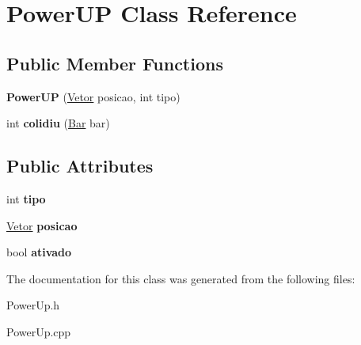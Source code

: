 \hypertarget{classPowerUP}{\section{\-Power\-U\-P \-Class \-Reference}
\label{classPowerUP}
}
\subsection*{\-Public \-Member \-Functions}
\begin{DoxyCompactItemize}
\item 
\hypertarget{classPowerUP_a5636298a65a37c1c8138d96e1b61684a}{{\bfseries \-Power\-U\-P} (\hyperlink{classVetor}{\-Vetor} posicao, int tipo)}\label{classPowerUP_a5636298a65a37c1c8138d96e1b61684a}

\item 
\hypertarget{classPowerUP_a06703041b5977e8cea4362ff6b9d4e90}{int {\bfseries colidiu} (\hyperlink{classBar}{\-Bar} bar)}\label{classPowerUP_a06703041b5977e8cea4362ff6b9d4e90}

\end{DoxyCompactItemize}
\subsection*{\-Public \-Attributes}
\begin{DoxyCompactItemize}
\item 
\hypertarget{classPowerUP_a83a746438f21b75738556af92e69d7c4}{int {\bfseries tipo}}\label{classPowerUP_a83a746438f21b75738556af92e69d7c4}

\item 
\hypertarget{classPowerUP_a23eeb213d8f01d976dce2da04ed1cd7b}{\hyperlink{classVetor}{\-Vetor} {\bfseries posicao}}\label{classPowerUP_a23eeb213d8f01d976dce2da04ed1cd7b}

\item 
\hypertarget{classPowerUP_aca4e403b0d439f34606c611c5e7269e5}{bool {\bfseries ativado}}\label{classPowerUP_aca4e403b0d439f34606c611c5e7269e5}

\end{DoxyCompactItemize}


\-The documentation for this class was generated from the following files\-:\begin{DoxyCompactItemize}
\item 
\-Power\-Up.\-h\item 
\-Power\-Up.\-cpp\end{DoxyCompactItemize}
